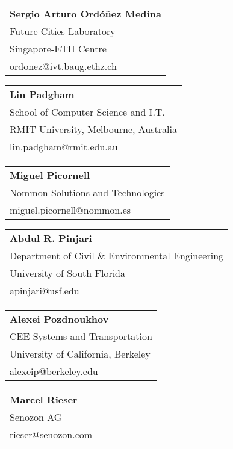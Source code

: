 \begin{tabular}[width=0.48\textwidth]{@{}l}
\textbf{Sergio Arturo Ordóñez Medina} \\
Future Cities Laboratory \\
Singapore-ETH Centre\\
ordonez@ivt.baug.ethz.ch \\
\end{tabular}

\begin{tabular}[width=0.48\textwidth]{@{}l}
\textbf{Lin Padgham} \\
School of Computer Science and I.T. \\
RMIT University, Melbourne, Australia \\
lin.padgham@rmit.edu.au \\
\end{tabular}

\begin{tabular}[width=0.48\textwidth]{@{}l}
\textbf{Miguel Picornell} \\
Nommon Solutions and Technologies \\
miguel.picornell@nommon.es \\
\end{tabular}

\begin{tabular}[width=0.48\textwidth]{@{}l}
\textbf{Abdul R. Pinjari} \\
Department of Civil \& Environmental Engineering \\
University of South Florida \\
apinjari@usf.edu \\
\end{tabular}

\begin{tabular}[width=0.48\textwidth]{@{}l}
\textbf{Alexei Pozdnoukhov} \\
CEE Systems and Transportation \\
University of California, Berkeley \\
alexeip@berkeley.edu \\
\end{tabular}

\begin{tabular}[width=0.48\textwidth]{@{}l}
\textbf{Marcel Rieser} \\
Senozon AG \\
rieser@senozon.com \\
\end{tabular}

